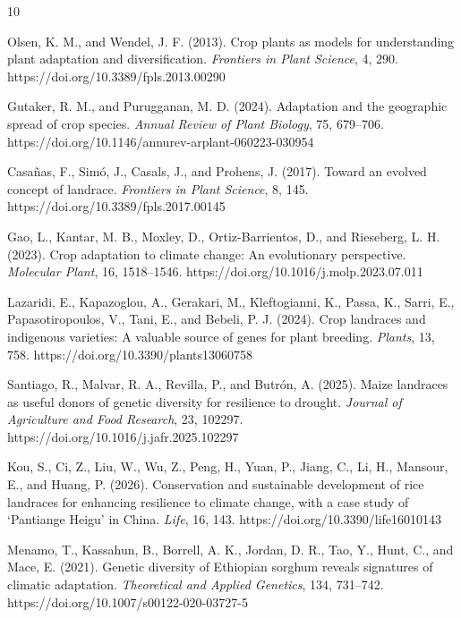 \documentclass[unnumsec,webpdf,contemporary,large]{oup-authoring-template}%
\theoremstyle{thmstyleone}%
\theoremstyle{thmstyletwo}%
\theoremstyle{thmstylethree}%
\begin{document}
\begin{thebibliography}{10}

Olsen, K. M., and Wendel, J. F. (2013).
Crop plants as models for understanding plant adaptation and diversification.
\textit{Frontiers in Plant Science}, 4, 290.
https://doi.org/10.3389/fpls.2013.00290

Gutaker, R. M., and Purugganan, M. D. (2024).
Adaptation and the geographic spread of crop species.
\textit{Annual Review of Plant Biology}, 75, 679--706.
https://doi.org/10.1146/annurev-arplant-060223-030954

Casa{\~n}as, F., Sim{\'o}, J., Casals, J., and Prohens, J. (2017).
Toward an evolved concept of landrace.
\textit{Frontiers in Plant Science}, 8, 145.
https://doi.org/10.3389/fpls.2017.00145

Gao, L., Kantar, M. B., Moxley, D., Ortiz-Barrientos, D., and Rieseberg, L. H. (2023).
Crop adaptation to climate change: An evolutionary perspective.
\textit{Molecular Plant}, 16, 1518--1546.
https://doi.org/10.1016/j.molp.2023.07.011

Lazaridi, E., Kapazoglou, A., Gerakari, M., Kleftogianni, K., Passa, K., Sarri, E., Papasotiropoulos, V., Tani, E., and Bebeli, P. J. (2024).
Crop landraces and indigenous varieties: A valuable source of genes for plant breeding.
\textit{Plants}, 13, 758.
https://doi.org/10.3390/plants13060758

Santiago, R., Malvar, R. A., Revilla, P., and Butr{\'o}n, A. (2025).
Maize landraces as useful donors of genetic diversity for resilience to drought.
\textit{Journal of Agriculture and Food Research}, 23, 102297.
https://doi.org/10.1016/j.jafr.2025.102297

Kou, S., Ci, Z., Liu, W., Wu, Z., Peng, H., Yuan, P., Jiang, C., Li, H., Mansour, E., and Huang, P. (2026).
Conservation and sustainable development of rice landraces for enhancing resilience to climate change, with a case study of {`Pantiange Heigu'} in China.
\textit{Life}, 16, 143.
https://doi.org/10.3390/life16010143

Menamo, T., Kassahun, B., Borrell, A. K., Jordan, D. R., Tao, Y., Hunt, C., and Mace, E. (2021).
Genetic diversity of Ethiopian sorghum reveals signatures of climatic adaptation.
\textit{Theoretical and Applied Genetics}, 134, 731--742.
https://doi.org/10.1007/s00122-020-03727-5


\end{thebibliography}
\end{document}
